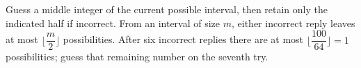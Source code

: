 Guess a middle integer of the current possible interval, then retain only the indicated half if incorrect. From an interval of size $m$, either incorrect reply leaves at most $\lfloor\dfrac{m}{2}\rfloor$ possibilities. After six incorrect replies there are at most $\lfloor\dfrac{100}{64}\rfloor=1$ possibilities; guess that remaining number on the seventh try.
